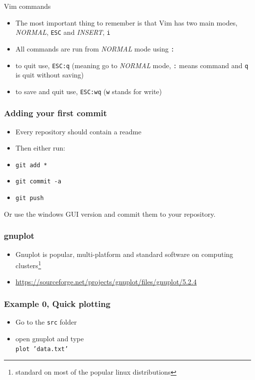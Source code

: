 \documentclass{beamer}
\begin{document}
\begin{frame}{Vim commands}
    \begin{itemize}
        \item The most important thing to remember is that Vim has two main modes, \textit{NORMAL}, \texttt{ESC} and \textit{INSERT}, \texttt{i}
        \item All commands are run from \textit{NORMAL} mode using \texttt{:}
        \item to quit use, \texttt{ESC:q} (meaning go to \textit{NORMAL} mode, \texttt{:} means command and \texttt{q} is quit without saving)
        \item to save and quit use, \texttt{ESC:wq} (\texttt{w} stands for write)
    \end{itemize}

\end{frame}

\begin{frame}
	\frametitle{Adding your first commit}
\begin{itemize}
    \item Every repository should contain a readme
	\item Then either run: 
	\item \texttt{git add *}
	\item \texttt{git commit -a}
	\item \texttt{git push}
\end{itemize}

Or use the windows GUI version and commit them to your repository.
\end{frame}

\begin{frame}
\frametitle{gnuplot} 
\begin{itemize}
	\item Gnuplot is popular, multi-platform and standard software on computing clusters\footnote{standard on most of the popular linux distributions} 
    \item \url{https://sourceforge.net/projects/gnuplot/files/gnuplot/5.2.4}
\end{itemize}
\end{frame}

\begin{frame}[fragile]
    \frametitle{Example 0, Quick plotting}
\begin{itemize}
	\item Go to the \texttt{src} folder
    \item open gnuplot and type \\ \texttt{plot 'data.txt'}
\end{itemize}
\end{frame}
\end{document}

